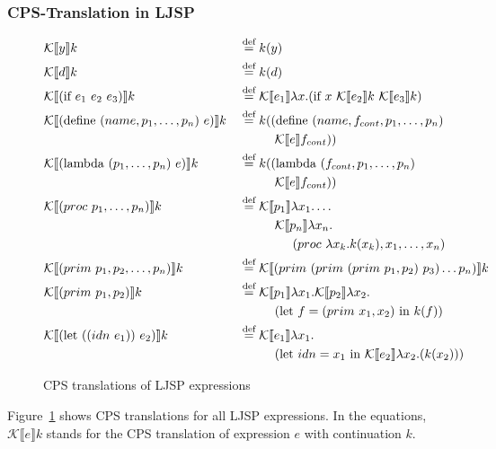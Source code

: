\documentclass[11pt]{report}
\newcommand{\eqdef}{\stackrel{\text{def}}{=}}%
\newcommand{\cpstrans}[1]{\ensuremath{\mathcal{K}\llbracket #1 \rrbracket}}
\begin{document}
\subsubsection{CPS-Translation in LJSP}
\begin{figure}[ht]
\begin{alignat*}{2}
&\cpstrans{y} k &&\eqdef k(y) \\
%
&\cpstrans{d} k &&\eqdef k(d) \\
%
&\cpstrans{(\text{if}\ e_1\ e_2\ e_3)} k &&\eqdef \cpstrans{e_1} \lambda x.(\text{if}\ x\ \cpstrans{e_2}k\ \cpstrans{e_3}k) \\
%
&\cpstrans{(\text{define}\ (name, p_1, \dots, p_n)\ e)} k &&\eqdef k((\text{define}\ (name, f_{cont}, p_1, \dots, p_n)\ \\
&&&\hspace{1cm}\cpstrans{e}f_{cont})) \\
%
&\cpstrans{(\text{lambda}\ (p_1, \dots, p_n)\ e)} k &&\eqdef k((\text{lambda}\ (f_{cont}, p_1, \dots, p_n)\ \\
&&&\hspace{1cm}\cpstrans{e}f_{cont})) \\
%
&\cpstrans{(proc\ p_1, \dots, p_n)} k &&\eqdef \cpstrans{p_1} \lambda x_1. \dots  \\
&&&\hspace{1 cm}\cpstrans{p_n} \lambda x_n.\\
&&&\hspace{1.5 cm}(proc\ \lambda x_k.k(x_k), x_1, \dots, x_n) \\
%
&\cpstrans{(prim\ p_1, p_2, \dots, p_n)} k &&\eqdef \cpstrans{(prim\ (prim\ (prim\ p_1, p_2)\ p_3) \dots p_n)} k\\
%
&\cpstrans{(prim\ p_1, p_2)} k &&\eqdef \cpstrans{p_1}\lambda x_1. \cpstrans{p_2}\lambda x_2.\\
&&&\hspace{1cm}(\text{let}\ f=(prim\ x_1, x_2)\ \text{in}\ k(f))\\
%
&\cpstrans{(\text{let}\ ((idn\ e_1))\ e_2)} k &&\eqdef \cpstrans{e_1} \lambda x_1. \\
&&&\hspace{1 cm}(\text{let}\ idn = x_1\ \text{in}\ \cpstrans{e_2} \lambda x_2.(k(x_2)))\\
\end{alignat*}
\caption{CPS translations of LJSP expressions}
\label{cpstrans}
\end{figure}

Figure~\ref{cpstrans} shows CPS translations for all LJSP expressions. In the equations, $\cpstrans{e} k$ stands for the CPS translation of expression $e$ with continuation $k$.
\end{document}
